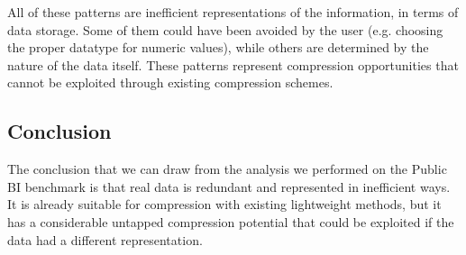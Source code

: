 All of these patterns are inefficient representations of the information, in terms of data storage. Some of them could have been avoided by the user (e.g. choosing the proper datatype for numeric values), while others are determined by the nature of the data itself. These patterns represent compression opportunities that cannot be exploited through existing compression schemes.
\subsection{Conclusion}
The conclusion that we can draw from the analysis we performed on the Public BI benchmark is that real data is redundant and represented in inefficient ways. It is already suitable for compression with existing lightweight methods, but it has a considerable untapped compression potential that could be exploited if the data had a different representation.

\iffalse
- scatter plot with skewness and kurtosis on distribution types background (see link from Benno) (Min/Max; Outliers characterisation; standard deviation; check if normal distribution; (in terms of distribution of numbers, dates, length of strings, character sets used, etc); metrics: range & standard deviation, mean (big skew = large range & big stdev), measures of spread = range and stdev)
\fi

